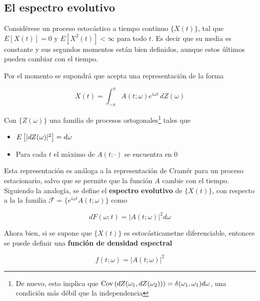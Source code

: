 
\subsection{El espectro evolutivo}

Consid\'erese un proceso estoc\'astico a tiempo continuo $\{X(t)\}$, tal que
$E[X(t)]=0$ y $E\left[ X^{2}(t)\right] < \infty$ para todo $t$. Es decir que su media es constante
y sus segundos momentos est\'an bien definidos, aunque 
estos \'ultimos pueden cambiar con el tiempo.

Por el momento se supondr\'a que acepta una representaci\'on de la forma

\begin{equation*}
X(t) = \int_{-\pi}^{\pi} A(t ; \omega) e^{i\omega t} \, d Z(\omega)
\end{equation*}

Con $\{ Z(\omega) \}$ una familia de procesos ortogonales\footnote{De nuevo, esto implica que
$\mathrm{Cov}\left( dZ(\omega_1,dZ(\omega_2)) \right) = \delta(\omega_1,\omega_1) d\omega$, una condici\'on m\'as
d\'ebil que la independencia} tales que

\begin{itemize}
\item $E \left[\lvert  dZ(\omega) \rvert^{2} \right] = d\omega$
\item Para cada $t$ el m\'aximo de $A(t;\cdot)$ se encuentra en 0
\end{itemize}

Esta representaci\'on es an\'aloga a la representaci\'on de Cram\'er para un proceso
estacionario, salvo que se permite que la funci\'on $A$ cambie con el tiempo.
Siguiendo la analog\'ia, se define 
el \textbf{espectro evolutivo} de $\{X(t)\}$, con respecto a la la familia
$\mathcal{F} = \{ e^{i\omega t} A(t; \omega) \}$
 como
 
\begin{equation*}
d F(\omega;t) = \lvert A(t;\omega) \lvert^{2} d\omega
\end{equation*}

Ahora bien, si se supone que $\{X(t)\}$ es estoc\'asticametne diferenciable, entonces
se puede definir una \textbf{funci\'on de densidad espectral}

\begin{equation*}
f(t;\omega) = \lvert A(t;\omega) \lvert^{2}
\end{equation*}

